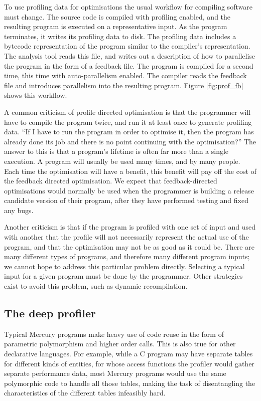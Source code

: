 
To use profiling data for optimisations the usual workflow for compiling
software must change.
The source code is compiled with profiling enabled, and the resulting program is
executed on a representative input.
As the program terminates,
it writes its profiling data to disk.
The profiling data includes a bytecode representation of the program
similar to the compiler's representation.
The analysis tool reads this file,
and writes out a description of how to parallelise the program in the form of a
feedback file.
The program is compiled for a second time,
this time with auto-parallelism enabled.
The compiler reads the feedback file and introduces parallelism into the
resulting program.
Figure \ref{fig:prof_fb} shows this workflow.

A common criticism of profile directed optimisation is that the programmer will
have to compile the program twice,
and run it at least once to generate profiling data.
``If I have to run the program in order to optimise it, then the program has
already
done its job and there is no point continuing with the optimisation?''
The answer to this is that a program's lifetime is often far more than a
single execution.
A program will usually be used many times, and by many people.
Each time the optimisation will have a benefit,
this benefit will pay off the cost of the feedback directed optimisation.
We expect that feedback-directed optimisations would normally be used
when the programmer is building a release candidate version of their
program,
after they have performed testing and fixed any bugs.

Another criticism is that if the program is profiled with one set of input and
used with another that the profile will not necessarily represent the actual use
of the program,
and that the optimisation may not be as good as it could be.
There are many different types of programs, and therefore many different
program inputs;
we cannot hope to address this particular problem directly.
Selecting a typical input for a given program must be done by the programmer.
Other strategies exist to avoid this problem,
such as dynamic recompilation.

\subsection{The deep profiler}
\label{sec:backgnd_deep}

Typical Mercury programs make heavy use of code reuse in the form of
parametric polymorphism and higher order calls.
This is also true for other declarative languages.
For example, while a C program may have
separate tables for different kinds of entities,
for whose access functions
the profiler would gather separate performance data,
most Mercury programs would use
the same polymorphic code to handle all those tables,
making the task of disentangling the characteristics of the different tables
infeasibly hard.

